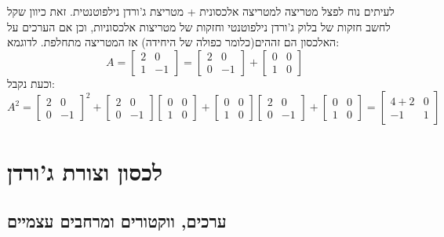 \documentclass{tstextbook}
\begin{document}
\begin{remark}
לעיתים נוח לפצל מטריצה למטריצה אלכסונית + מטריצת ג'ורדן נילפוטנטית. זאת כיוון שקל לחשב חזקות של בלוק ג'ורדן נילפוטנטי וחזקות של מטריצות אלכסוניות, וכן אם הערכים על האלכסון הם זההים(כלומר כפולה של היחידה) אז המטריצה מתחלפת. לדוגמא:
$$A=\begin{bmatrix}2 & 0 \\1 & -1\end{bmatrix}=\begin{bmatrix}2 & 0 \\0 & -1\end{bmatrix}+\begin{bmatrix}0 & 0 \\1 & 0
\end{bmatrix}$$
וכעת נקבל:
$$A^{2}=\begin{bmatrix}2 & 0 \\0 & -1 \end{bmatrix}^{2}+\begin{bmatrix}2 & 0 \\0 & -1\end{bmatrix}\begin{bmatrix}0 & 0 \\1 & 0\end{bmatrix}+\begin{bmatrix}0 & 0 \\1 & 0\end{bmatrix}\begin{bmatrix}2 & 0 \\0 & -1\end{bmatrix}+\begin{bmatrix}0 & 0 \\1 & 0\end{bmatrix}=\begin{bmatrix}4+2 & 0 \\-1 & 1
\end{bmatrix}$$

\end{remark}
\chapter{לכסון וצורת ג'ורדן}

\section{ערכים, ווקטורים ומרחבים עצמיים}
\end{document}
